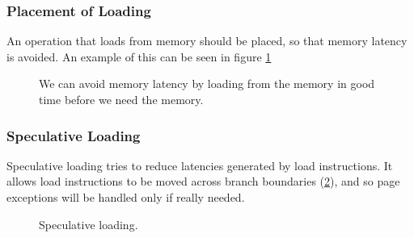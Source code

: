 \subsubsection{Placement of Loading}
An operation that loads from memory should be placed, so that memory latency is avoided. An example of this can be seen in figure \ref{fig:placement-of-loading}
\begin{figure}[H]
  \centering
  \caption{We can avoid memory latency by loading from the memory in good time before we need the memory.}
  \label{fig:placement-of-loading}
\end{figure}
\subsubsection{Speculative Loading}
Speculative loading tries to reduce latencies generated by load instructions. It allows load instructions to be moved across branch boundaries (\ref{fig:speculative-loading}), and so page exceptions will be handled only if really needed.
\begin{figure}[H]
  \centering
  \caption{Speculative loading.}
  \label{fig:speculative-loading}
\end{figure}


